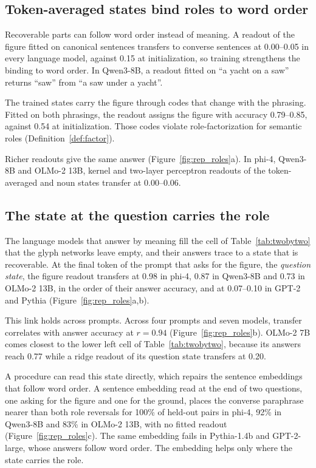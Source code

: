 \documentclass[10pt]{article}
\theoremstyle{plain}
\theoremstyle{remark}
\begin{document}
\subsection{Token-averaged states bind roles to word order}
\label{sec:roles}

Recoverable parts can follow word order instead of meaning. A readout of the figure fitted on canonical sentences transfers to converse sentences at 0.00--0.05 in every language model, against 0.15 at initialization, so training strengthens the binding to word order. In Qwen3-8B, a readout fitted on ``a yacht on a saw'' returns ``saw'' from ``a saw under a yacht''.

The trained states carry the figure through codes that change with the phrasing. Fitted on both phrasings, the readout assigns the figure with accuracy 0.79--0.85, against 0.54 at initialization. Those codes violate role-factorization for semantic roles (Definition~\ref{def:factor}).

Richer readouts give the same answer (Figure~\ref{fig:rep_roles}a). In phi-4, Qwen3-8B and OLMo-2 13B, kernel and two-layer perceptron readouts of the token-averaged and noun states transfer at 0.00--0.06.

\subsection{The state at the question carries the role}
\label{sec:behavior}

The language models that answer by meaning fill the cell of Table~\ref{tab:twobytwo} that the glyph networks leave empty, and their answers trace to a state that is recoverable. At the final token of the prompt that asks for the figure, the \emph{question state}, the figure readout transfers at 0.98 in phi-4, 0.87 in Qwen3-8B and 0.73 in OLMo-2 13B, in the order of their answer accuracy, and at 0.07--0.10 in GPT-2 and Pythia (Figure~\ref{fig:rep_roles}a,b).

This link holds across prompts. Across four prompts and seven models, transfer correlates with answer accuracy at $r = 0.94$ (Figure~\ref{fig:rep_roles}b). OLMo-2 7B comes closest to the lower left cell of Table~\ref{tab:twobytwo}, because its answers reach 0.77 while a ridge readout of its question state transfers at 0.20.

A procedure can read this state directly, which repairs the sentence embeddings that follow word order. A sentence embedding read at the end of two questions, one asking for the figure and one for the ground, places the converse paraphrase nearer than both role reversals for 100\% of held-out pairs in phi-4, 92\% in Qwen3-8B and 83\% in OLMo-2 13B, with no fitted readout (Figure~\ref{fig:rep_roles}c). The same embedding fails in Pythia-1.4b and GPT-2-large, whose answers follow word order. The embedding helps only where the state carries the role.
\end{document}
